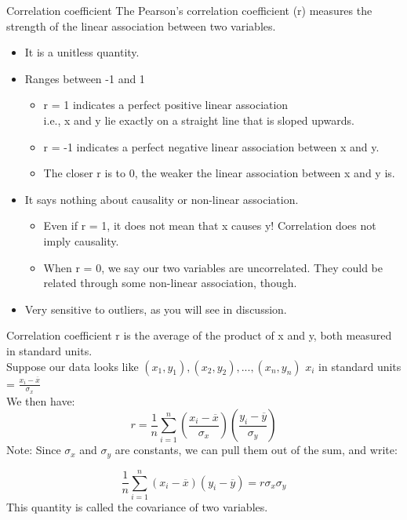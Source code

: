 \documentclass[aspectratio=169]{../latex_main/tntbeamer}  %
\begin{document}
	
	\begin{frame}{Correlation coefficient}
	    The Pearson’s correlation coefficient (r) measures the strength of the linear association between two variables. 
	    \begin{itemize}
	        \item It is a unitless quantity.
	        \item Ranges between -1 and 1
	        \begin{itemize}
	            \item r = 1 indicates a perfect positive \alert{linear} association\\
	            i.e., x and y lie exactly on a straight line that is sloped upwards. 
	            \item r = -1 indicates a perfect negative linear association between x and y.
	            \item The closer r is to 0, the weaker the linear association between x and y is.
	        \end{itemize}
	        \item It says nothing about causality or non-linear association.
	        \begin{itemize}
	            \item Even if r = 1, it does not mean that x causes y! \alert{Correlation does not imply causality}.
	            \item When r = 0, we say our two variables are uncorrelated. They could be related through some non-linear association, though.
	        \end{itemize}
	        \item Very sensitive to outliers, as you will see in discussion. 
	    \end{itemize}
	\end{frame}
	
	
	\begin{frame}{Correlation coefficient}
	    r is the average of the product of x and y, both measured in standard units. \\
Suppose our data looks like ${(x_1, y_1),(x_2,y_2),...,(x_n,y_n)} $  $x_i$ in standard units = $ \frac{x_i - \overline{x}}{\sigma_x}$\\
\bigskip
We then have:
\begin{equation*}
    r=\frac{1}{n}\sum\limits_{i=1}^n\left(\frac{x_i-\overline{x}}{\sigma_x}\right)\left(\frac{y_i-\overline{y}}{\sigma_y}\right)
\end{equation*}
Note: Since    $\sigma_x$    and    $\sigma_y$    are constants, we can pull them out of the sum, and write: 

\begin{equation*}
   \frac{1}{n}\sum\limits_{i=1}^n\left(x_i-\overline{x}\right)\left(y_i-\overline{y}\right) = r\sigma_x\sigma_y
\end{equation*}
	This quantity is called the covariance of two variables.
   
	\end{frame}
	
\end{document}

